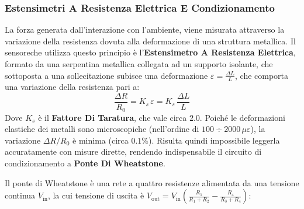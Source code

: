 ﻿\documentclass[11pt, a4paper]{article}
\begin{document}
\subsubsection{Estensimetri A Resistenza Elettrica E Condizionamento}
La forza generata dall'interazione con l'ambiente, viene misurata attraverso la variazione della resistenza dovuta alla deformazione di una struttura metallica. Il sensoreche utilizza questo principio è l'\textbf{Estensimetro A Resistenza Elettrica}, formato da una serpentina metallica collegata ad un supporto isolante, che sottoposta a una sollecitazione subisce una deformazione $\varepsilon = \frac{\Delta L}{L}$, che comporta una variazione della resistenza pari a:
\[
    \frac{\Delta R}{R_0} = K_{s} \, \varepsilon = K_{s} \, \frac{\Delta L}{L}
\]
Dove $K_s$ è il \textbf{Fattore Di Taratura}, che vale circa $2.0$. Poiché le deformazioni elastiche dei metalli sono microscopiche (nell'ordine di $100\div2000\,\mu\varepsilon$), la variazione $\Delta R / R_0$ è minima (circa $0.1\%$). Risulta quindi impossibile leggerla accuratamente con misure dirette, rendendo indispensabile il circuito di condizionamento a \textbf{Ponte Di Wheatstone}.

Il ponte di Wheatstone è una rete a quattro resistenze alimentata da una tensione continua $V_{\text{in}}$, la cui tensione di uscita è $V_{\text{out}} = V_{\text{in}} \left( \frac{R_1}{R_1 + R_2} - \frac{R_4}{R_3 + R_4} \right)$:
\end{document}
